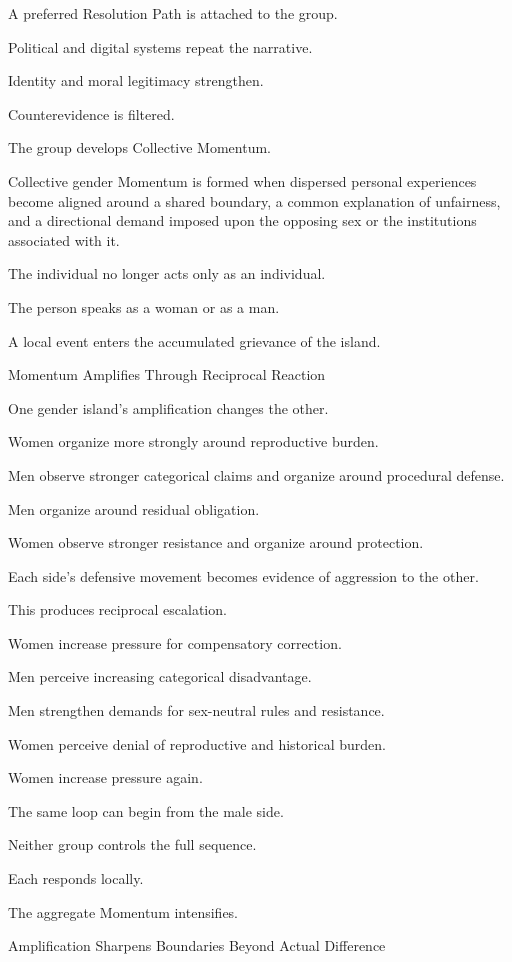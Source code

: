 A preferred Resolution Path is attached to the group.

Political and digital systems repeat the narrative.

Identity and moral legitimacy strengthen.

Counterevidence is filtered.

The group develops Collective Momentum.

Collective gender Momentum is formed when dispersed personal experiences become aligned around a shared boundary, a common explanation of unfairness, and a directional demand imposed upon the opposing sex or the institutions associated with it.

The individual no longer acts only as an individual.

The person speaks as a woman or as a man.

A local event enters the accumulated grievance of the island.

Momentum Amplifies Through Reciprocal Reaction

One gender island’s amplification changes the other.

Women organize more strongly around reproductive burden.

Men observe stronger categorical claims and organize around procedural defense.

Men organize around residual obligation.

Women observe stronger resistance and organize around protection.

Each side’s defensive movement becomes evidence of aggression to the other.

This produces reciprocal escalation.

Women increase pressure for compensatory correction.

Men perceive increasing categorical disadvantage.

Men strengthen demands for sex-neutral rules and resistance.

Women perceive denial of reproductive and historical burden.

Women increase pressure again.

The same loop can begin from the male side.

Neither group controls the full sequence.

Each responds locally.

The aggregate Momentum intensifies.

Amplification Sharpens Boundaries Beyond Actual Difference

